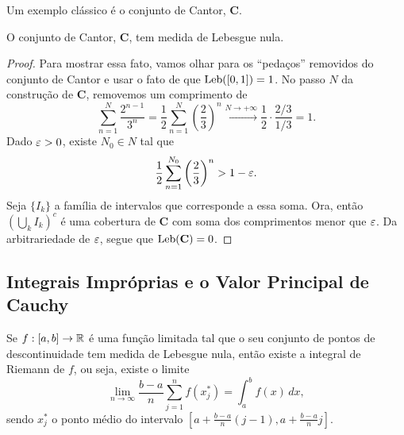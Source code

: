         Um exemplo clássico é o conjunto de Cantor, $\mathbf{C}$.
        \begin{proposicao}
        \label{cantor-medida-nula}
            O conjunto de Cantor, $\mathbf{C}$, tem medida de Lebesgue nula.
        \end{proposicao}
        \begin{proof}
            Para mostrar essa fato, vamos olhar para os ``pedaços'' removidos do conjunto de
            Cantor e usar o fato de que $\mathrm{Leb}([0,1]) = 1$. No passo $N$ da construção de 
            $\mathbf{C}$, removemos um comprimento de
            \begin{equation*}
                \sum_{n=1}^N \frac{2^{n-1}}{3^n}=\frac{1}{2}\sum_{n=1}^N \left(\frac{2}{3}\right)^n
                \xrightarrow{N\to +\infty} \frac{1}{2}\cdot\frac{2/3}{1/3} = 1.
            \end{equation*}
            Dado $\varepsilon>0$, existe $N_0\in N$ tal que
            \begin{equation*}
                \frac{1}{2}\sum_{n=1}^{N_0} \left(\frac{2}{3}\right)^n > 1 - \varepsilon.
            \end{equation*}
            Seja $\{I_k\}$ a família de intervalos que corresponde a essa soma. Ora, então
            $\left( \bigcup_k I_k \right)^c$ é uma cobertura de $\mathbf{C}$ com soma
            dos comprimentos menor que $\varepsilon$. Da arbitrariedade de $\varepsilon$, segue que
            $\mathrm{Leb}(\mathbf{C}) = 0$.
        \end{proof}
        
    \subsection{Integrais Impróprias e o Valor Principal de Cauchy}
        Se $f:[a,b]\to\mathbb{R}$ é uma função limitada tal que o seu conjunto de pontos de descontinuidade
        tem medida de Lebesgue nula, então existe a integral de Riemann de $f$, ou seja, existe
        o limite
        \begin{equation*}
            \lim_{n\to\infty} \frac{b-a}{n}\sum_{j=1}^n f(x_j^*) = \int_a^b f(x) \, dx,
        \end{equation*}
        sendo $x_j^*$ o ponto médio do intervalo 
        $\displaystyle{ \left[ a + \frac{b-a}{n}(j-1), a + \frac{b-a}{n}j \right] }$.
        
